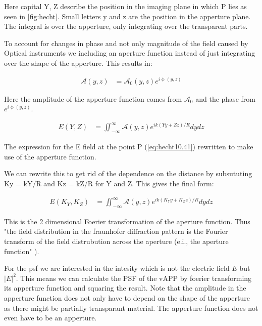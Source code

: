 Here capital Y, Z describe the position in the imaging plane in which P lies as seen in \autoref{fig:hecht}. Small letters y and z are the position in the apperture plane. The integral is over the apperture, only integrating over the transparent parts. 

To account for changes in phase and not only magnitude of the field caused by Optical instruments we including an aperture function instead of just integrating over the shape of the apperture. This results in:

\begin{subequations}
  \begin{align}
    \mathscr{A}(y,z) &= \mathscr{A}_0 (y,z)e^{i\upphi(y,z)}
  \end{align}
\end{subequations}

Here the amplitude of the apperture function comes from $\mathscr{A}_0$ and the phase from $e^{i\upphi(y,z)}$.

\begin{subequations}
  \begin{align}
    E(Y,Z) &= \iint_{-\infty}^{\infty} \mathscr{A}(y,z) e^{ik(Yy+Zz)/R} dydz
  \end{align}
\end{subequations}

The expression for the E field at the point P (\autoref{eq:hecht10.41}) rewritten to make use of the apperture function.

We can rewrite this to get rid of the dependence on the distance by subsututing Ky = kY/R and Kz = kZ/R for Y and Z. This gives the final form: 

\begin{subequations}
  \begin{align}
    E(K_Y,K_Z) &= \iint_{-\infty}^{\infty} \mathscr{A}(y,z) e^{ik(K_Yy+K_Zz)/R} dydz
  \end{align}
\end{subequations}

This is the 2 dimensional Foerier transformation of the aperture function. Thus "the field distribution in the fraunhofer diffraction pattern is the Fourier transform of the field distrubution across the aperture (e.i., the aperture function" \cite{hecht}). 

For the psf we are interested in the intesity which is not the electric field $E$ but ${|E|}^2$. This means we can calculate the PSF of the vAPP by foerier transforming its apperture function and squaring the result. Note that the amplitude in the apperture function does not only have to depend on the shape of the apperture as there might be partially transparant material. The apperture function does not even have to be an apperture.

